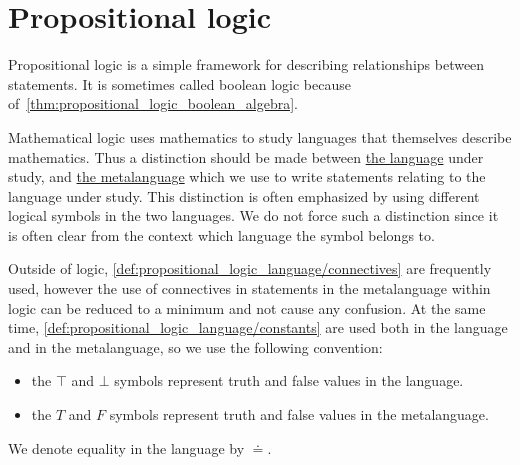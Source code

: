 \section{Propositional logic}\label{sec:propositional_logic}

Propositional logic is a simple framework for describing relationships between statements. It is sometimes called boolean logic because of~\cref{thm:propositional_logic_boolean_algebra}.

\begin{note}\label{note:metalanguage}
  Mathematical logic uses mathematics to study languages that themselves describe mathematics. Thus a distinction should be made between \ul{the language} under study, and \ul{the metalanguage} which we use to write statements relating to the language under study. This distinction is often emphasized by using different logical symbols in the two languages. We do not force such a distinction since it is often clear from the context which language the symbol belongs to.

  Outside of logic, \ref{def:propositional_logic_language/connectives} are frequently used, however the use of connectives in statements in the metalanguage within logic can be reduced to a minimum and not cause any confusion. At the same time, \ref{def:propositional_logic_language/constants} are used both in the language and in the metalanguage, so we use the following convention:
  \begin{itemize}
    \item the $\top$ and $\bot$ symbols represent truth and false values in the language.
    \item the $T$ and $F$ symbols represent truth and false values in the metalanguage.
  \end{itemize}

  We denote equality in the language by $\doteq$.
\end{note}

